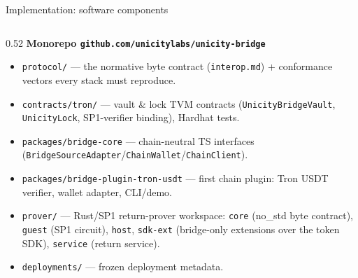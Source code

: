 \documentclass[aspectratio=169,10pt]{beamer}
\begin{document}
\begin{frame}{Implementation: software components}
\begin{columns}[T]
\begin{column}{0.52\textwidth}
\textbf{Monorepo \texttt{github.com/unicitylabs/unicity-bridge}}
\begin{itemize}\scriptsize
  \item \texttt{protocol/} --- the normative byte contract
        (\texttt{interop.md}) + conformance vectors every stack must reproduce.
  \item \texttt{contracts/tron/} --- vault \& lock TVM contracts
        (\texttt{UnicityBridgeVault}, \texttt{UnicityLock}, SP1-verifier binding),
        Hardhat tests.
  \item \texttt{packages/bridge-core} --- chain-neutral TS interfaces
        (\texttt{BridgeSourceAdapter}/\texttt{ChainWallet}/\texttt{ChainClient}).
  \item \texttt{packages/bridge-plugin-tron-usdt} --- first chain plugin: Tron
        USDT verifier, wallet adapter, CLI/demo.
  \item \texttt{prover/} --- Rust/SP1 return-prover workspace: \texttt{core}
        (no\_std byte contract), \texttt{guest} (SP1 circuit), \texttt{host},
        \texttt{sdk-ext} (bridge-only extensions over the token SDK),
        \texttt{service} (return service).
  \item \texttt{deployments/} --- frozen deployment metadata.
\end{itemize}
\end{column}
\end{columns}
\end{frame}
\end{document}
